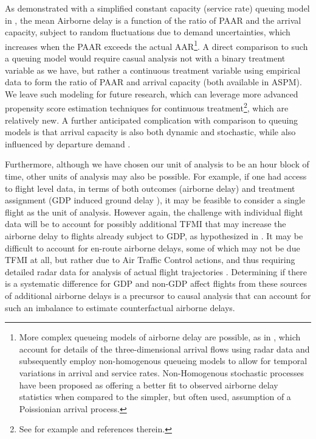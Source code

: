 \documentclass[conference]{IEEEtran}
\begin{document}
As demonstrated with a simplified constant capacity (service rate) queuing model in \cite{ball2001analysis}, the mean Airborne delay is a function of the ratio of PAAR and the arrival capacity,  subject to random fluctuations due to demand uncertainties, which increases when the PAAR exceeds the actual AAR\footnote{More complex queueing models of airborne delay are possible, as in \cite{gwiggner2014data}, which account for details of the three-dimensional arrival flows using radar data and subsequently employ non-homogenous queueing models to allow for temporal variations in arrival and service rates.  Non-Homogenous stochastic processes have been proposed as offering a better fit to observed airborne delay statistics \cite{caccavale2014model} when compared to the simpler, but often used, assumption of a Poissionian arrival process.}.  A direct comparison to such a queuing model would require casual analysis not with a binary treatment variable as we have, but rather a continuous treatment variable using empirical data to form the ratio of PAAR and arrival capacity (both available in ASPM).  We leave such modeling for future research, which can leverage more advanced propensity score estimation techniques for continuous treatment\footnote{See for example \cite{fong2017covariate} and references therein.}, which are relatively new.   A further anticipated complication with comparison to queuing models is that arrival capacity is also both dynamic and stochastic, while also influenced by departure demand \cite{jacquillat2015endogenous}. 

Furthermore, although we have chosen our unit of analysis to be an hour block of time, other units of analysis may also be possible.  For example, if one had access to flight level data, in terms of both outcomes (airborne delay) and treatment assignment (GDP induced ground delay ), it may be feasible to consider a single flight as the unit of analysis.  However again, the challenge with individual flight data will be to account for possibly additional TFMI that may increase the airborne delay to flights already subject to GDP, as hypothesized in \cite{bilimoria2016analysis}.  It may be difficult to account for en-route airborne delays, some of which may not be due TFMI at all, but rather due to Air Traffic Control actions, and thus requiring detailed radar data for analysis of actual flight trajectories \cite{belkoura2016generation}.  Determining if there is a systematic difference for GDP and non-GDP affect flights from these sources of additional airborne delays is a precursor to causal analysis that can account for such an imbalance to estimate counterfactual airborne delays.  
\end{document}
